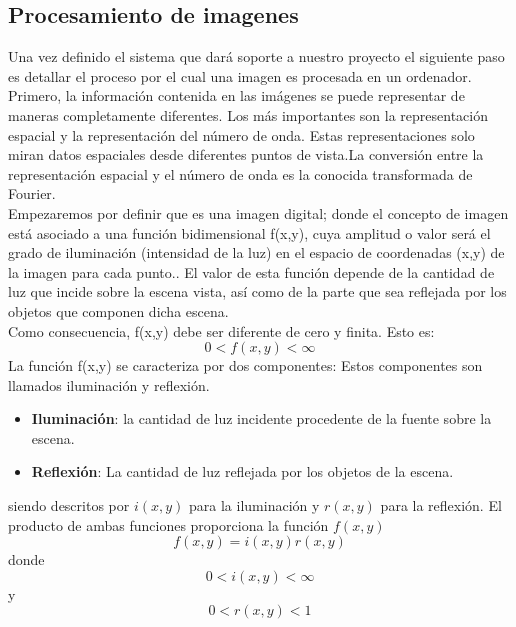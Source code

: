\subsection{Procesamiento de imagenes}
Una vez definido el sistema que dará soporte a nuestro proyecto el siguiente paso es detallar el
proceso por el cual una imagen es procesada en un ordenador.\\
Primero, la información contenida en las imágenes se puede representar de maneras completamente diferentes. 
Los más importantes son la representación espacial y la representación del número de onda. Estas representaciones solo 
miran datos espaciales desde diferentes puntos de vista.La conversión entre la representación espacial y el número de 
onda es la conocida transformada de Fourier.\cite{Bernd1997}\\
Empezaremos por definir que es una imagen digital; donde el concepto de imagen está asociado a una función 
bidimensional f(x,y), cuya amplitud o valor será el grado de iluminación (intensidad de la luz) en el espacio de
coordenadas (x,y) de la imagen para cada punto.\cite{arturodelaescalera2011}.
El valor de esta función depende de la
cantidad de luz que incide sobre la escena vista, así como de la parte que sea reflejada
por los objetos que componen dicha escena.\\
Como consecuencia, f(x,y) debe ser diferente de cero y finita. Esto es:
\begin{equation}
    0 < f(x,y) < \infty
\end{equation}
La función f(x,y) se caracteriza por dos componentes: \cite{joseramon2005} Estos componentes son llamados
iluminación y reflexión.
\begin{itemize}
    \item \textbf{Iluminación}: la cantidad de luz incidente procedente de la fuente sobre la
    escena.
    \item \textbf{Reflexión}: La cantidad de luz reflejada por los objetos de la escena.
\end{itemize}
siendo descritos por $i(x,y)$ para la iluminación y $r(x,y)$ para la reflexión. El producto de ambas funciones
proporciona la función $f(x,y)$
\begin{equation}
    f(x,y) = i(x,y)r(x,y)
\end{equation}
donde 
\begin{equation}
    0 < i(x,y) < \infty
\end{equation}
y 
\begin{equation}
    0 < r(x,y) < 1
\end{equation}
